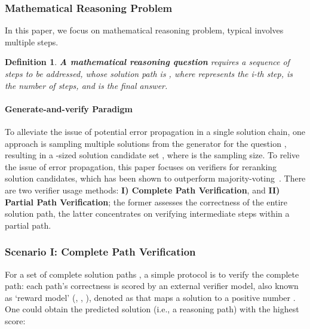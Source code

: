 \documentclass[11pt]{article}
\theoremstyle{plain}
\theoremstyle{claim}
\theoremstyle{rethinking}
\theoremstyle{researchquestion}
\theoremstyle{findings}
\theoremstyle{fact}
\newtheorem{definition}{Definition}\theoremstyle{lemma}
\theoremstyle{proper}
\theoremstyle{remark}
\begin{document}
\subsubsection{Mathematical  Reasoning Problem}
In this paper, we focus on mathematical reasoning problem, typical involves multiple steps.

\begin{definition}
   \textbf{A mathematical  reasoning question} \textit{ requires a sequence of steps to be addressed, whose solution path is , where  represents the i-th step,  is the number of  steps, and  is the final answer.} 
\end{definition}



\paragraph{Generate-and-verify Paradigm} To alleviate the issue of potential error propagation in a single solution chain, one approach is sampling multiple solutions from the generator  for the question , resulting in a -sized solution candidate set , where  is the sampling size. To relive the issue of error propagation, this paper focuses on verifiers for reranking solution  candidates, which has been shown to outperform majority-voting~\citep{self-consistency23}. 
There are two  verifier usage methods: \textbf{I) Complete Path Verification}, and \textbf{II) Partial Path Verification}; the former assesses the correctness of the entire solution path, the latter concentrates on verifying  intermediate steps within a partial path.







\subsubsection{Scenario I: Complete Path Verification}
For a set of complete solution paths ,  a simple protocol is  to verify the complete path: each path’s correctness is scored by an external verifier model, also known as `reward model' (\citealp{li2023stepv}, \citealp{deepmind-process22}, \citealp{openai-process23}), denoted as  that maps a solution to a positive number . One could obtain the predicted solution (i.e., a reasoning path) with the  highest score:
\end{document}
